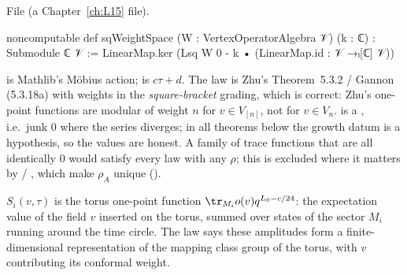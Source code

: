 \noindent File  (a Chapter~\ref{ch:L15} file).
\begin{leancode}
noncomputable def sqWeightSpace (W : VertexOperatorAlgebra 𝒱) (k : ℂ) : Submodule ℂ 𝒱 :=
  LinearMap.ker (Lsq W 0 - k • (LinearMap.id : 𝒱 →ₗ[ℂ] 𝒱))
\end{leancode}
\begin{dictionary}
 is Mathlib's Möbius action;  is $c\tau+d$. The law is Zhu's Theorem~5.3.2 / Gannon (5.3.18a)
with weights in the \emph{square-bracket} grading, which is correct: Zhu's one-point functions are modular of weight $n$ for
$v\in V_{[n]}$, not for $v\in V_n$.  is a , i.e.\ junk $0$ where the series diverges; in all
theorems below the growth datum  is a hypothesis, so the values are honest. A family of trace functions
that are all identically $0$ would satisfy every law with any $\rho$; this is excluded where it matters by
 / , which make $\rho_A$ unique ().
\end{dictionary}
\begin{physics}
$S_i(v,\tau)$ is the torus one-point function $\tr_{M_i}o(v)q^{L_0-c/24}$: the expectation value of the field $v$ inserted
on the torus, summed over states of the sector $M_i$ running around the time circle. The law says these amplitudes form a
finite-dimensional representation of the mapping class group of the torus, with $v$ contributing its conformal weight.
\end{physics}

